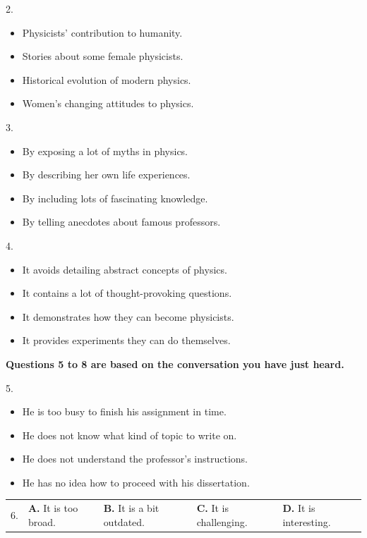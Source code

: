\documentclass[UTF8,11pt]{ctexart}
\begin{document}
2.


\begin{itemize}[leftmargin=2em,itemsep=.2em,topsep=.4em]\item[A.] Physicists’ contribution to humanity.
\item[B.] Stories about some female physicists.
\item[C.] Historical evolution of modern physics.
\item[D.] Women’s changing attitudes to physics.
\end{itemize}

3.


\begin{itemize}[leftmargin=2em,itemsep=.2em,topsep=.4em]\item[A.] By exposing a lot of myths in physics.
\item[B.] By describing her own life experiences.
\item[C.] By including lots of fascinating knowledge.
\item[D.] By telling anecdotes about famous professors.
\end{itemize}

4.


\begin{itemize}[leftmargin=2em,itemsep=.2em,topsep=.4em]\item[A.] It avoids detailing abstract concepts of physics.
\item[B.] It contains a lot of thought-provoking questions.
\item[C.] It demonstrates how they can become physicists.
\item[D.] It provides experiments they can do themselves.
\end{itemize}

\textbf{Questions 5 to 8 are based on the conversation you have just heard.}


5.


\begin{itemize}[leftmargin=2em,itemsep=.2em,topsep=.4em]\item[A.] He is too busy to finish his assignment in time.
\item[B.] He does not know what kind of topic to write on.
\item[C.] He does not understand the professor’s instructions.
\item[D.] He has no idea how to proceed with his dissertation.
\end{itemize}

\noindent\begin{tabularx}{\linewidth}{@{}lXXXX@{}}6. & \textbf{A.} It is too broad. & \textbf{B.} It is a bit outdated. & \textbf{C.} It is challenging. & \textbf{D.} It is interesting.\\\end{tabularx}\par
\end{document}
